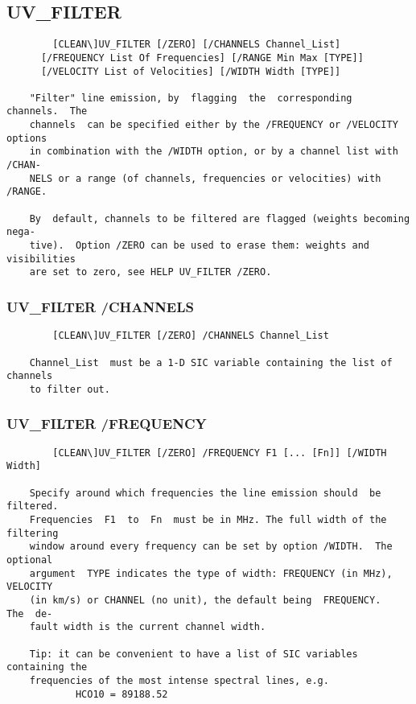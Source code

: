 \subsection{UV\_FILTER}
\begin{verbatim}
        [CLEAN\]UV_FILTER [/ZERO] [/CHANNELS Channel_List]
      [/FREQUENCY List Of Frequencies] [/RANGE Min Max [TYPE]]
      [/VELOCITY List of Velocities] [/WIDTH Width [TYPE]]

    "Filter" line emission, by  flagging  the  corresponding  channels.  The
    channels  can be specified either by the /FREQUENCY or /VELOCITY options
    in combination with the /WIDTH option, or by a channel list with  /CHAN-
    NELS or a range (of channels, frequencies or velocities) with /RANGE.

    By  default, channels to be filtered are flagged (weights becoming nega-
    tive).  Option /ZERO can be used to erase them: weights and visibilities
    are set to zero, see HELP UV_FILTER /ZERO.

\end{verbatim}
\subsubsection{UV\_FILTER /CHANNELS}
\begin{verbatim}
        [CLEAN\]UV_FILTER [/ZERO] /CHANNELS Channel_List

    Channel_List  must be a 1-D SIC variable containing the list of channels
    to filter out.

\end{verbatim}
\subsubsection{UV\_FILTER /FREQUENCY}
\begin{verbatim}
        [CLEAN\]UV_FILTER [/ZERO] /FREQUENCY F1 [... [Fn]] [/WIDTH Width]

    Specify around which frequencies the line emission should  be  filtered.
    Frequencies  F1  to  Fn  must be in MHz. The full width of the filtering
    window around every frequency can be set by option /WIDTH.  The optional
    argument  TYPE indicates the type of width: FREQUENCY (in MHz), VELOCITY
    (in km/s) or CHANNEL (no unit), the default being  FREQUENCY.   The  de-
    fault width is the current channel width.

    Tip: it can be convenient to have a list of SIC variables containing the
    frequencies of the most intense spectral lines, e.g.
            HCO10 = 89188.52

\end{verbatim}

